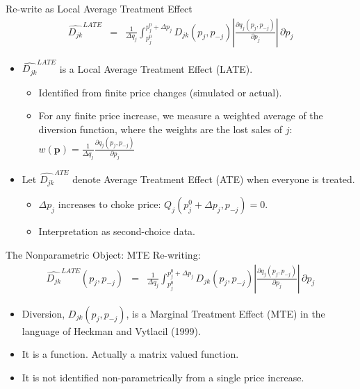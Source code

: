 \documentclass[xcolor=pdftex,dvipsnames,table,mathserif,aspectratio=169]{beamer}
\begin{document}
\begin{frame}{Re-write as Local Average Treatment Effect}
\begin{eqnarray*}
\widehat{D_{jk} }^{LATE}&=& \frac{1}{\Delta q_j} \int_{p_j^{0}}^{p_j^{0}+\Delta p_j} D_{jk}(p_j,p_{-j}) \left| \frac{\partial q_j (p_j,p_{-j})}{\partial p_j} \right|\, \partial p_j
\end{eqnarray*}
\begin{itemize}
\item $\widehat{D_{jk}}^{LATE}$ is a Local Average Treatment Effect \alert{(LATE)}.
\begin{itemize}
\item Identified from finite price changes (simulated or actual).
\item For any finite price increase, we measure a weighted average of the diversion function, where the weights are the lost sales of $j$:  $w(\mathbf{p}) = \frac{1}{\Delta q_j} \frac{\partial q_j(p_j,p_{-j})}{\partial p_j} $
\end{itemize}
\pause
\item Let $\widehat{D_{jk}}^{ATE}$ denote Average Treatment Effect \alert{(ATE)} when everyone is treated.
 \begin{itemize}
\item $\Delta p_j$ increases to \alert{choke price}:  $Q_j(p_j^0 + \Delta p_j, p_{-j}) = 0$.
\item Interpretation as second-choice data.
\end{itemize}
\end{itemize}
\end{frame}



\begin{frame}{The Nonparametric Object: MTE}
Re-writing:
\begin{eqnarray*}
\widehat{D_{jk}}^{LATE}(p_j,p_{-j})&=& \frac{1}{\Delta q_j} \int_{p_j^{0}}^{p_j^{0}+\Delta p_j} D_{jk}(p_j,p_{-j}) \left| \frac{\partial q_j (p_j,p_{-j})}{\partial p_j} \right|\, \partial p_j
\end{eqnarray*}
\begin{itemize}
\item Diversion, $D_{jk}(p_j,p_{-j})$, is a Marginal Treatment Effect \alert{(MTE)}  in the language of Heckman and Vytlacil (1999).
\item It is a \alert{function}. Actually a \alert{matrix valued function}.
\item It is not identified non-parametrically from a single price increase.
\end{itemize}
\end{frame}
\end{document}

